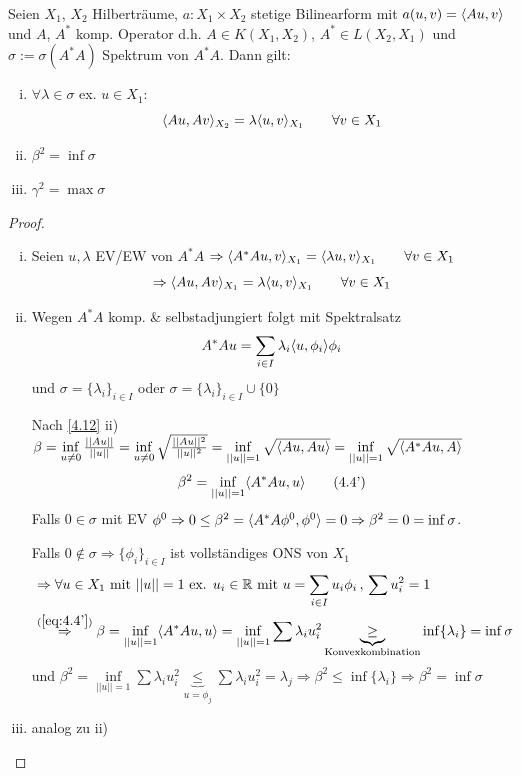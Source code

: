 \begin{satz} \label{4.13}
Seien $X_1$, $X_2$ Hilberträume, $a: X_1 \times X_2$ stetige Bilinearform mit $a(u,v) = \langle Au, v \rangle$ und $A$, $A^*$ komp. Operator d.h. $A \in K(X_1,X_2)$, $A^* \in L(X_2,X_1)$ und $\sigma := \sigma(A^*A)$ Spektrum von $A^*A$. Dann gilt:
\begin{enumerate}[i)]
	\item $\forall \lambda \in \sigma$ ex. $u \in X_1$:
	\[
		\langle Au, Av \rangle_{X_2} = \lambda \langle u, v \rangle_{X_1} \qquad \forall v \in X_1
	\]
	\item $\beta^2 = \inf \sigma$
	\item $\gamma^2 = \max \sigma$
\end{enumerate}
\begin{proof}
\begin{enumerate}[i)]
\item Seien $u, \lambda$ EV/EW von $A^*A$ $\Rightarrow \langle A^*Au, v \rangle_{X_1} = \langle \lambda u, v \rangle_{X_1} \qquad \forall v \in X_1$
\[
	\Rightarrow \langle Au, Av \rangle_{X_1} = \lambda \langle u, v \rangle_{X_1} \qquad \forall v \in X_1
\]
\item Wegen $A^*A$ komp. \& selbstadjungiert folgt mit Spektralsatz
\[
	A^*Au = \sum\limits_{i \in I} \lambda_i \dotp{u}{\phi_i}\phi_i
\]
und $\sigma = \{\lambda_i\}_{i \in I}$ oder $\sigma = \{\lambda_i\}_{i \in I} \cup \{0\}$

Nach \ref{4.12} ii) $\beta = \inf\limits_{u \neq 0} \frac{||Au||}{||u||} = \inf\limits_{u \neq 0} \sqrt{\frac{||Au||^2}{||u||^2}} = \inf\limits_{||u|| = 1} \sqrt{\langle Au, Au \rangle} = \inf\limits_{||u||=1} \sqrt{\langle A^*Au, A \rangle}$
\begin{align} \label{eq:4.4'}
	\beta^2 = \inf\limits_{||u||=1} \langle A^*Au, u \rangle \tag{4.4'}
\end{align}
Falls $0 \in \sigma$ mit EV $\phi^0 \Rightarrow 0 \leq \beta^2 = \dotp{A^*A\phi^0}{\phi^0} = 0 \Rightarrow \beta^2 = 0 = \inf \sigma$.

Falls $0 \not\in \sigma \Rightarrow \{\phi_i\}_{i \in I}$ ist vollständiges ONS von $X_1$
\begin{align*}
	&\Rightarrow \forall u \in X_1 \text{ mit } ||u||=1 \text{ ex. } u_i \in \R \text{ mit } u = \sum\limits_{i \in I} u_i \phi_i \, , \, \sum u_i^2 = 1 \\
	&\overset{(\ref{eq:4.4'})}{\Rightarrow} \beta = \inf\limits_{||u||=1} \dotp{A^*Au}{u} = \inf\limits_{||u||=1} \sum \lambda_i u_i^2  \underbrace{\geq}_{\text{Konvexkombination}} \inf \{\lambda_i\} = \inf \sigma
\end{align*}
und $\beta^2 = \inf\limits_{||u||=1} \sum \lambda_i u_i^2 \underbrace{\leq}_{u = \phi_j} \sum \lambda_i u_i^2 = \lambda_j \Rightarrow \beta^2 \leq \inf \{\lambda_i\} \Rightarrow \beta^2 = \inf \sigma$
\item analog zu ii)
\end{enumerate}
\end{proof}
\end{satz}


